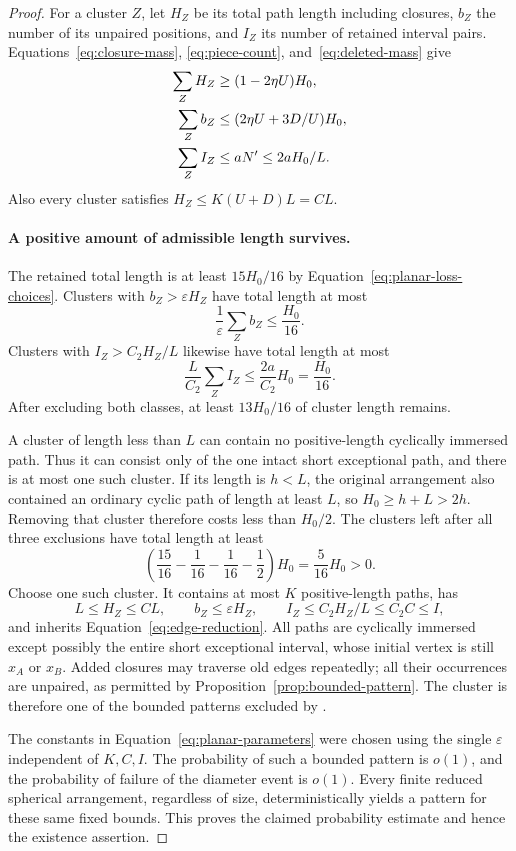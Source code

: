 \begin{proof}
For a cluster $Z$, let $H_Z$ be its total path length including closures,
$b_Z$ the number of its unpaired positions, and $I_Z$ its number of
retained interval pairs.  Equations~\ref{eq:closure-mass},
\ref{eq:piece-count}, and~\ref{eq:deleted-mass} give
\begin{align}
 \sum_Z H_Z&\ge(1-2\eta U)H_0, \notag\\
 \sum_Z b_Z&\le(2\eta U+3D/U)H_0, \label{eq:cluster-totals}\\
 \sum_Z I_Z&\le aN'\le 2aH_0/L. \notag
\end{align}
Also every cluster satisfies $H_Z\le K(U+D)L=CL$.

\paragraph{A positive amount of admissible length survives.}
The retained total length is at least $15H_0/16$ by
Equation~\ref{eq:planar-loss-choices}.  Clusters with
$b_Z>\varepsilon H_Z$ have total length at most
\[
 \frac1\varepsilon\sum_Z b_Z\le\frac{H_0}{16}.
\]
Clusters with $I_Z>C_2H_Z/L$ likewise have total length at most
\[
 \frac{L}{C_2}\sum_Z I_Z
 \le\frac{2a}{C_2}H_0=\frac{H_0}{16}.
\]
After excluding both classes, at least $13H_0/16$ of cluster length
remains.

A cluster of length less than $L$ can contain no positive-length
cyclically immersed path.  Thus it can consist only of the one intact
short exceptional path, and there is at most one such cluster.  If its
length is $h<L$, the original arrangement also contained an ordinary
cyclic path of length at least $L$, so $H_0\ge h+L>2h$.  Removing that
cluster therefore costs less than $H_0/2$.  The clusters left after
all three exclusions have total length at least
\[
 \left(\frac{15}{16}-\frac1{16}-\frac1{16}-\frac12\right)H_0
 =\frac5{16}H_0>0.
\]
Choose one such cluster.  It contains at most $K$ positive-length
paths, has
\[
 L\le H_Z\le CL,\qquad
 b_Z\le\varepsilon H_Z,\qquad
 I_Z\le C_2H_Z/L\le C_2C\le I,
\]
and inherits Equation~\ref{eq:edge-reduction}.  All paths are cyclically
immersed except possibly the entire short exceptional interval, whose
initial vertex is still $x_A$ or $x_B$.  Added closures may traverse old
edges repeatedly; all their occurrences are unpaired, as permitted
by Proposition~\ref{prop:bounded-pattern}.  The cluster is therefore
one of the bounded patterns excluded by .

The constants in Equation~\ref{eq:planar-parameters} were chosen using
the single $\varepsilon$ independent of $K,C,I$.  The probability of
such a bounded pattern is $o(1)$, and the probability of failure of the
diameter event is $o(1)$.  Every finite reduced spherical arrangement,
regardless of size, deterministically yields a pattern for these same
fixed bounds.  This proves the claimed probability estimate and hence
the existence assertion.
\end{proof}
